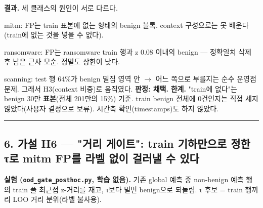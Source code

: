 \textbf{결과.} 세 클래스의 원인이 서로 다르다.

\par\noindent \textbullet\enspace mitm: FP는 train 표본에 없는 형태의 benign 블록. context 구성으로는 못 배운다(train에 없는 것을 넣을 수 없다).


\par\noindent \textbullet\enspace ransomware: FP는 ransomware train 행과 z 0.08 이내의 benign — 정확일치 삭제 후 남은 근사 모순. 정밀도 상한이 낮다.


\par\noindent \textbullet\enspace scanning: test 행 64\%가 benign 밀집 영역 안  \ensuremath{\rightarrow}  어느 쪽으로 부를지는 순수 운영점 문제. 그래서 H3(context 비중)로 움직였다. \textbf{판정: 채택.} \textbf{한계.} "train에 없다"는 benign 30만 \textbf{표본}(전체 201만의 15\%) 기준. train benign 전체에 0건인지는 직접 세지 않았다(사용자 결정으로 보류). 시간축 확인(timestamps)도 하지 않았다.



\medskip\hrule\medskip
\subsection{6. 가설 H6 — "거리 게이트": train 기하만으로 정한 τ로 mitm FP를 라벨 없이 걸러낼 수 있다}
\textbf{실험 (\texttt{ood\_\allowbreak{}\allowbreak{}gate\allowbreak{}\_\allowbreak{}\allowbreak{}posthoc\allowbreak{}.\allowbreak{}py}, 학습 없음).} 기존 global 예측 중 non-benign 예측 행의 train 풀 최근접 z-거리를 재고, τ보다 멀면 benign으로 되돌림. τ 후보 =\allowbreak{} train 행끼리 LOO 거리 분위(라벨 불사용).

